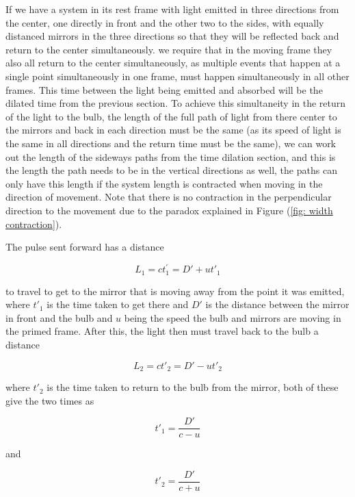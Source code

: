 If we have a system in its rest frame with light emitted in three directions from the center, one directly in front and the other two to the sides, with equally distanced mirrors in the three directions so that they will be reflected back and return to the center simultaneously.
we require that in the moving frame they also all return to the center simultaneously, as multiple events that happen at a single point simultaneously in one frame, must happen simultaneously in all other frames.
This time between the light being emitted and absorbed will be the dilated time from the previous section.
To achieve this simultaneity in the return of the light to the bulb, the length of the full path of light from there center to the mirrors and back in each direction must be the same (as its speed of light is the same in all directions and the return time must be the same), we can work out the length of the sideways paths from the time dilation section, and this is the length the path needs to be in the vertical directions as well, the paths can only have this length if the system length is contracted when moving in the direction of movement.
Note that there is no contraction in the perpendicular direction to the movement due to the paradox explained in Figure (\ref{fig: width contraction}).

The pulse sent forward has a distance

\begin{equation}
	L_1= c{t}_1^{'}= D{'} + ut{'}_1
\end{equation}

to travel to get to the mirror that is moving away from the point it was emitted, where $t{'}_1$ is the time taken to get there and $D{'}$ is the distance between the mirror in front and the bulb and $u$ being the speed the bulb and mirrors are moving in the primed frame.
After this, the light then must travel back to the bulb a distance

\begin{equation}
	L_2 = ct{'}_2= D{'} - ut{'}_2
\end{equation}

where $t{'}_2$ is the time taken to return to the bulb from the mirror, both of these give the two times as

\begin{equation}
	t{'}_1=\frac{D'}{c-u}
\end{equation}

and

\begin{equation}
	t{'}_2=\frac{D'}{c+u}
\end{equation}

